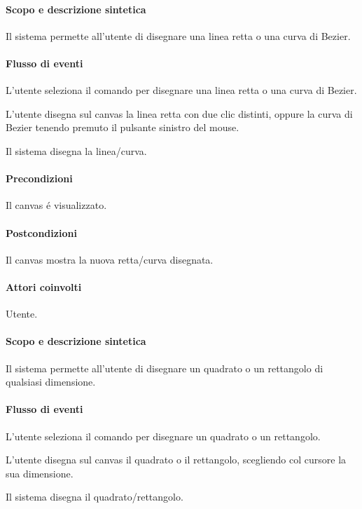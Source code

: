 \paragraph{Scopo e descrizione sintetica} 
Il sistema permette all'utente di disegnare una linea retta o una curva di Bezier.
\paragraph{Flusso di eventi}
\begin{elenconumerato}[\textbf{}]{\subsubsecindent}
\item L'utente seleziona il comando per disegnare una linea retta o una curva di Bezier.
\item L'utente disegna sul canvas la linea retta con due clic distinti, oppure la curva di Bezier tenendo premuto il pulsante sinistro del mouse.
\item Il sistema disegna la linea/curva.
\end{elenconumerato}
\paragraph{Precondizioni} Il canvas \'e visualizzato.
\paragraph{Postcondizioni} Il canvas mostra la nuova retta/curva disegnata.

\paragraph{Attori coinvolti} Utente.
\paragraph{Scopo e descrizione sintetica} 
Il sistema permette all'utente di disegnare un quadrato o un rettangolo di qualsiasi dimensione.
\paragraph{Flusso di eventi}
\begin{elenconumerato}[\textbf{}]{\subsubsecindent}
\item L'utente seleziona il comando per disegnare un quadrato o un rettangolo.
\item L'utente disegna sul canvas il quadrato o il rettangolo, scegliendo col cursore la sua dimensione.
\item Il sistema disegna il quadrato/rettangolo.
\end{elenconumerato}
